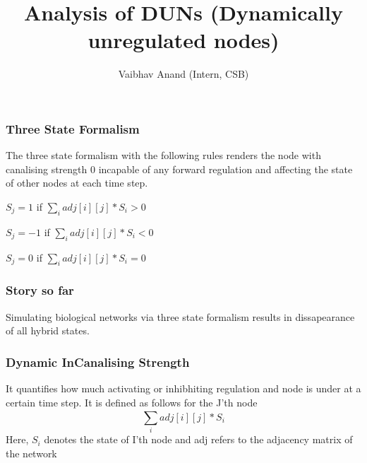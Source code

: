 \documentclass[t]{beamer}
\title{Analysis of DUNs (Dynamically unregulated nodes) }
\author{Vaibhav Anand (Intern, CSB)}
\begin{document}
\begin{frame}
\titlepage 
\end{frame}

\begin{frame}
	\frametitle {Three State Formalism}
	The three state formalism with the following rules renders the node with canalising strength 0 incapable of any forward regulation and affecting the state of other nodes at each time step.
	\begin{item}
	\item $ S_j = 1 $ if    $  \sum_{ i } ^ { } adj[i][j] * S_i> 0 $

	\item $ S_j = -1 $ if    $  \sum_{ i } ^ { } adj[i][j] * S_i< 0 $

	\item $ S_j = 0 $ if    $  \sum_{ i } ^ { } adj[i][j] * S_i= 0 $


	\end{item}
	\end{frame}

\begin{frame}

	\frametitle{Story so far}

	Simulating biological networks via three state formalism results in dissapearance of all hybrid states.

\end{frame}



\begin{frame}
	\frametitle{Dynamic InCanalising Strength}

	It quantifies how much activating or inhibhiting regulation and node is under at a certain time step. It is defined as follows for the J'th node
\[   \sum_{ i } ^ { } adj[i][j] * S_i                    \]
Here, $ S_i $ denotes the state of I'th node and adj refers to the adjacency matrix of the network 
\end{frame}
\end{document}
